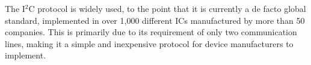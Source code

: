 The I$^2$C protocol is widely used, to the point that it is currently a de facto global 
standard, implemented in over 1,000 different ICs manufactured by more than 50 
companies. This is primarily due to its requirement of only two communication lines, 
making it a simple and inexpensive protocol for device manufacturers to implement.





